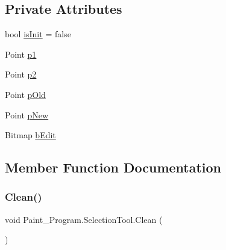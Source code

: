 \subsection*{Private Attributes}
\begin{DoxyCompactItemize}
\item 
bool \mbox{\hyperlink{class_paint___program_1_1_selection_tool_a11340d6e8c518de6c2e2727bdb9b8479}{is\+Init}} = false
\item 
Point \mbox{\hyperlink{class_paint___program_1_1_selection_tool_aa222db7e2507d4a78432ee18f21c2bec}{p1}}
\item 
Point \mbox{\hyperlink{class_paint___program_1_1_selection_tool_adc89856894483623d0735ffc031fe883}{p2}}
\item 
Point \mbox{\hyperlink{class_paint___program_1_1_selection_tool_ad9d0cc8becec7128bf025fb17d957a90}{p\+Old}}
\item 
Point \mbox{\hyperlink{class_paint___program_1_1_selection_tool_a90bc3a955ec60db4d812d20c54cd42ce}{p\+New}}
\item 
Bitmap \mbox{\hyperlink{class_paint___program_1_1_selection_tool_a90ad41bebfb20e575899626d62c88b1a}{b\+Edit}}
\end{DoxyCompactItemize}


\subsection{Member Function Documentation}
\mbox{\label{class_paint___program_1_1_selection_tool_ac8b5875e3a8a10cac0c4e37f286c0e2e}} 
\subsubsection{\texorpdfstring{Clean()}{Clean()}}
{\footnotesize\ttfamily void Paint\+\_\+\+Program.\+Selection\+Tool.\+Clean (\begin{DoxyParamCaption}{ }\end{DoxyParamCaption})\hspace{0.3cm}{\ttfamily [inline]}}

\mbox{\label{class_paint___program_1_1_selection_tool_ac93f281cfcc677551b140c350661d9df}} 
